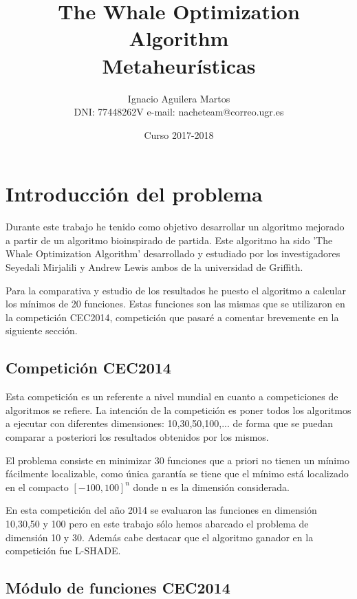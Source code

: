 \documentclass[12pt,a4paper]{article}
\author{Ignacio Aguilera Martos \\
	DNI: 77448262V       e-mail: nacheteam@correo.ugr.es}
\title{The Whale Optimization Algorithm \\ Metaheurísticas}
\date{Curso 2017-2018}
\begin{document}
	\maketitle

	\tableofcontents
	\newpage
	\listoffigures
	\listoftables

	\newpage



	\section{Introducción del problema}
	\label{sec:introProblema}
	
		Durante este trabajo he tenido como objetivo desarrollar un algoritmo mejorado a partir de un algoritmo bioinspirado de partida. Este algoritmo ha sido 'The Whale Optimization Algorithm' desarrollado y estudiado por los investigadores Seyedali Mirjalili y Andrew Lewis ambos de la universidad de Griffith.
		
		Para la comparativa y estudio de los resultados he puesto el algoritmo a calcular los mínimos de 20 funciones. Estas funciones son las mismas que se utilizaron en la competición CEC2014, competición que pasaré a comentar brevemente en la siguiente sección.
	
	\subsection{Competición CEC2014}
	
		Esta competición es un referente a nivel mundial en cuanto a competiciones de algoritmos se refiere. La intención de la competición es poner todos los algoritmos a ejecutar con diferentes dimensiones: 10,30,50,100,... de forma que se puedan comparar a posteriori los resultados obtenidos por los mismos.
		
		El problema consiste en minimizar 30 funciones que a priori no tienen un mínimo fácilmente localizable, como única garantía se tiene que el mínimo está localizado en el compacto $[-100,100]^n$ donde n es la dimensión considerada.
		
		En esta competición del año 2014 se evaluaron las funciones en dimensión 10,30,50 y 100 pero en este trabajo sólo hemos abarcado el problema de dimensión 10 y 30. Además cabe destacar que el algoritmo ganador en la competición fue L-SHADE.
	
	\subsection{Módulo de funciones CEC2014}
	
\end{document}
